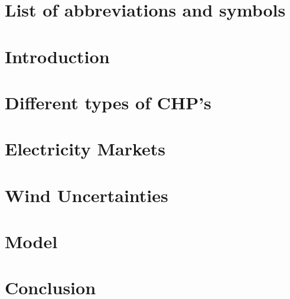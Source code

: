 \documentclass[pdftex12pt, a4paper]{book}
\newcommand{\resetfigurecounter}{\setcounter{figure}{0}}
\begin{document}
\newpage

\tableofcontents

\resetfigurecounter

\newenvironment{abstract}{
    \onehalfspacing%
    \chapter*{\centering Abstract}%
}{}

\chapter*{List of abbreviations and symbols}
\printglossary[type=\acronymtype,title=Abbreviations,toctitle=Abbreviations]
\printglossary[type=symbol]

\listoffigures

\listoftables

\chapter{Introduction}
\renewcommand{\thepage}{\arabic{page}}
\setcounter{page}{1}
\glsresetall
\label{c:Introduction}

%

%
%

\chapter{Different types of CHP's}
\label{c:TypesCHP}

%

\chapter{Electricity Markets}
\label{c:ElecMar}



\chapter{Wind Uncertainties}
\label{c:WindUnc}

%

\chapter{Model}
\label{c:Model}

%

\chapter{Conclusion}
\label{s:Conclusion}

%



%
\end{document}
